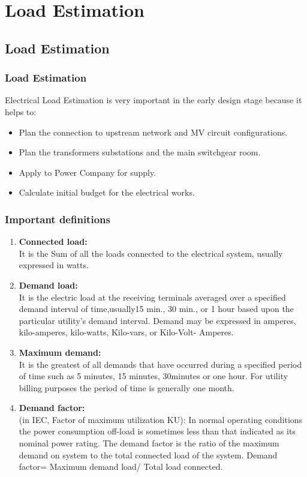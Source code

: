 \documentclass[12pt,fleqn]{book} %
\begin{document}
\part {Load Estimation}

\chapter{Load Estimation}



\section{Load Estimation }
Electrical Load Estimation is very important in the early design stage because it helps to:
\begin{itemize}
\item  Plan the connection to upstream network and MV circuit configurations.
\item Plan the transformers substations and the main switchgear room.
\item Apply to Power Company for supply.
\item Calculate initial budget for the electrical works.
 \end{itemize}
\section{Important definitions}
\begin{enumerate}
\item \textbf {Connected load:}
\\It is the Sum of all the loads connected to the electrical system, usually expressed in watts.
\item \textbf {Demand load:}
\\It is the electric load at the receiving terminals averaged over a specified demand interval of time,usually15 min., 30 min., or 1 hour based upon the particular utility’s demand interval. Demand
may be expressed in amperes, kilo-amperes, kilo-watts, Kilo-vars, or Kilo-Volt- Amperes.
\item \textbf {Maximum demand:}
\\It is the greatest of all demands that have occurred during a specified period of time such as 5 minutes, 15 minutes, 30minutes or one hour. For utility billing purposes the period of time is generally one month.
\item \textbf {Demand factor:}
\\(in IEC, Factor of maximum utilization KU): In normal operating conditions the power consumption off-load is sometimes less than that indicated as its nominal power rating. The demand factor is the ratio of the maximum demand on system to the total connected load of the system. Demand factor= Maximum demand load/ Total load connected.
\end{enumerate}
\end{document}

